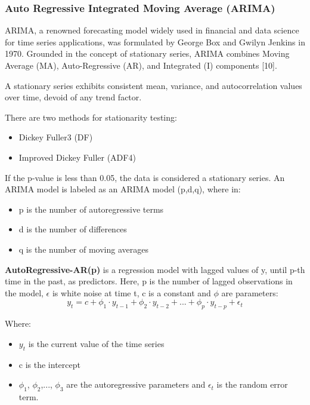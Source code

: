 \documentclass{ieeeojies}
\begin{document}
\subsubsection{\textbf{Auto Regressive Integrated Moving Average (ARIMA)}}
ARIMA, a renowned forecasting model widely used in financial and data science for time series applications, was formulated by George Box and Gwilyn Jenkins in 1970. Grounded in the concept of stationary series, ARIMA combines Moving Average (MA), Auto-Regressive (AR), and Integrated (I) components [10]. 

A stationary series exhibits consistent mean, variance, and autocorrelation values over time, devoid of any trend factor.

There are two methods for stationarity testing:
\begin{itemize}
    \item Dickey Fuller3 (DF)
    \item Improved Dickey Fuller (ADF4)
\end{itemize}

If the p-value is less than 0.05, the data is considered a stationary series. An ARIMA model is labeled as an ARIMA model (p,d,q), where in:

\begin{itemize}
    \item p is the number of autoregressive terms
    \item d is the number of differences
    \item q is the number of moving averages
\end{itemize}

\textbf{AutoRegressive-AR(p)} is a regression model with lagged values of y, until p-th time in the past, as predictors. Here, p is the number of lagged observations in the model, $\epsilon$ is white noise at time t, c is a constant and $\phi$ are parameters:
\begin{equation*}
    y_t = c + \phi_1 \cdot y_{t-1} + \phi_2 \cdot y_{t-2} + ... + \phi_p \cdot y_{t-p} + \epsilon_t
\end{equation*}

Where:
\begin{itemize}
    \item $y_t$ is the current value of the time series
    \item c is the intercept
    \item $\phi_1$, $\phi_2$,..., $\phi_3$ are the autoregressive parameters and $\epsilon_t$  is the random error term. 
\end{itemize}
\end{document}
